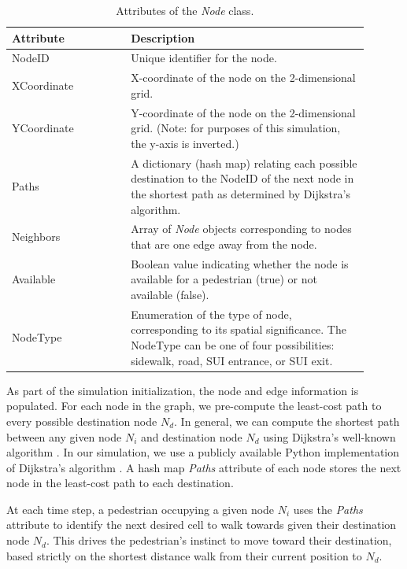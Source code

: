 \documentclass[12pt]{article}
\begin{document}
\def\arraystretch{1.5}
\begin{table}[hb!]
  \centering
    \begin{tabular}{p{0.3\linewidth}p{0.6\linewidth}}
     \hline
     Attribute & Description \\
     \hline
     NodeID      & Unique identifier for the node. \\
     XCoordinate & X-coordinate of the node on the 2-dimensional grid. \\
     YCoordinate & Y-coordinate of the node on the 2-dimensional grid.
                   (Note: for purposes of this simulation, the y-axis is
                    inverted.) \\
     Paths       & A dictionary (hash map) relating each possible destination
                   to the NodeID of the next node in the shortest path as
                   determined by Dijkstra's algorithm. \\
     Neighbors & Array of \textit{Node} objects corresponding to nodes that are
                 one edge away from the node. \\
     Available	& Boolean value indicating whether the node is available for a
                  pedestrian (true) or not available (false). \\
     NodeType   & Enumeration of the type of node, corresponding to its
                  spatial significance. The NodeType can be one of four
                  possibilities: sidewalk, road, SUI entrance, or SUI exit. \\
     \hline
    \end{tabular}
    \caption{Attributes of the \textit{Node} class.}
  \label{table:node}
\end{table}

As part of the simulation initialization, the node and edge information is
populated. For each node in the graph, we pre-compute the least-cost path to
every possible destination node $N_d$. In general, we can compute the shortest
path between any given node $N_i$ and destination node $N_d$ using Dijkstra's
well-known algorithm \cite{dijkstra1959note}. In our simulation, we use a
publicly available Python implementation of Dijkstra's algorithm
\cite{eppstein-dijkstra}. A hash map \textit{Paths} attribute of each node
stores the next node in the least-cost path to each destination.

At each time step, a pedestrian occupying a given node $N_i$ uses the
\textit{Paths} attribute to identify the next desired cell to walk towards given
their destination node $N_d$. This drives the pedestrian’s instinct to move
toward their destination, based strictly on the shortest distance walk from
their current position to $N_d$.
\end{document}
